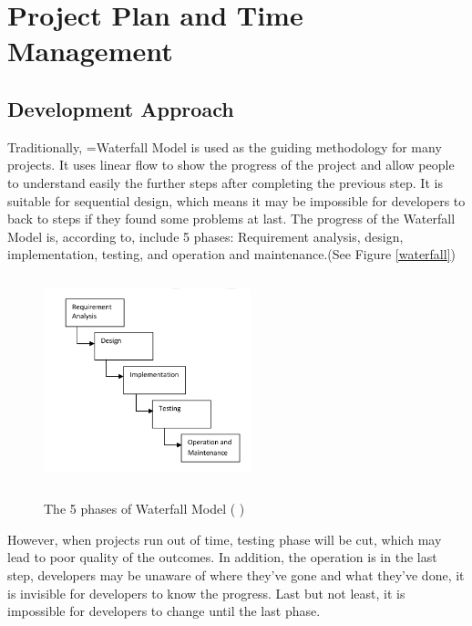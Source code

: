 \clearpage
\section{Project Plan and Time Management}

 

\subsection{Development Approach}

Traditionally, =Waterfall Model is used as the guiding methodology for many projects. It uses linear flow to show the progress of the project and allow people to understand easily the further steps after completing the previous step. It is suitable for sequential design, which means it may be impossible for developers to back to steps if they found some problems at last. 
The progress of the Waterfall Model is, according to\cite{Adenowo2013}, include 5 phases: Requirement analysis, design, implementation, testing, and operation and maintenance.(See Figure \ref{waterfall})

\begin{figure}[h]
	\centering	
	\includegraphics[width=6cm, height=6cm]{Figs/Waterfall-Model}\\[1ex]
	\caption{The 5 phases of Waterfall Model ( \cite{Adenowo2013})}
	\label{fig:waterfall}
\end{figure}

However, when projects run out of time, testing phase will be cut, which may lead to poor quality of the outcomes. In addition, the operation is in the last step, developers may be unaware of where they’ve gone and what they’ve done, it is invisible for developers to know the progress. Last but not least, it is impossible for developers to change until the last phase.

